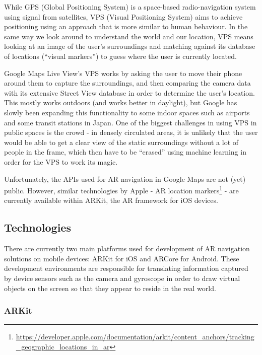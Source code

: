        While GPS (Global Positioning System) is a space-based radio-navigation system using signal from satellites, VPS (Visual Positioning System) aims to achieve positioning using an approach that is more similar to human behaviour. In the same way we look around to understand the world and our location, VPS means looking at an image of the user’s surroundings and matching against its database of locations (“visual markers”) to guess where the user is currently located.
        
        Google Maps Live View’s VPS works by asking the user to move their phone around them to capture the surroundings, and then comparing the camera data with its extensive Street View database in order to determine the user’s location. This mostly works outdoors (and works better in daylight), but Google has slowly been expanding this functionality to some indoor spaces such as airports\cite{glasgow2021mapai}  and some transit stations in Japan\cite{gmaps2021japan}. One of the biggest challenges in using VPS in public spaces is the crowd - in densely circulated areas, it is unlikely that the user would be able to get a clear view of the static surroundings without a lot of people in the frame, which then have to be “erased”\cite{senzer2021magiceraser} using machine learning in order for the VPS to work its magic.
        
        Unfortunately, the APIs used for AR navigation in Google Maps are not (yet) public. However, similar technologies by Apple - AR location markers\footnote{\url{https://developer.apple.com/documentation/arkit/content_anchors/tracking_geographic_locations_in_ar}} - are currently available within ARKit, the AR framework for iOS devices.

        \subsection{Technologies} \label{2:ar_technologies}
        
        There are currently two main platforms used for development of AR navigation solutions on mobile devices: ARKit for iOS and ARCore for Android. These development environments are responsible for translating information captured by device sensors such as the camera and gyroscope in order to draw virtual objects on the screen so that they appear to reside in the real world.
        
            \subsubsection{ARKit} \label{2:arkit}
            
